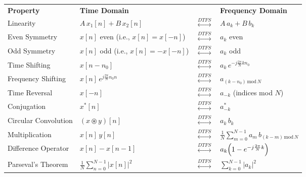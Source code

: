 \documentclass[8pt]{article}
\begin{document}
\begin{table}[ht]
        \label{tab:dtfourier_properties}
    \begin{tabular}{llll}
        \textbf{Property}    & \textbf{Time Domain}                    &                                     & \textbf{Frequency Domain}                                       \\
        Linearity            & \(A\,x_1[n] + B\,x_2[n]\)               & \(\overset{DTFS}{\leftrightarrow}\) & \(A\,a_k + B\,b_k\)                                             \\
        Even Symmetry        & \(x[n]\) even (i.e., \(x[n]=x[-n]\))    & \(\overset{DTFS}{\leftrightarrow}\) & \(a_k\) even                                                    \\
        Odd Symmetry         & \(x[n]\) odd (i.e., \(x[n]=-x[-n]\))    & \(\overset{DTFS}{\leftrightarrow}\) & \(a_k\) odd                                                     \\
        Time Shifting        & \(x[n-n_0]\)                            & \(\overset{DTFS}{\leftrightarrow}\) & \(a_k\,e^{-j\frac{2\pi}{N} k n_0}\)                             \\
        Frequency Shifting   & \(x[n]\,e^{j\frac{2\pi}{N} n_0 n}\)     & \(\overset{DTFS}{\leftrightarrow}\) & \(a_{(k-n_0)\,\mathrm{mod}\,N}\)                                \\
        Time Reversal        & \(x[-n]\)                               & \(\overset{DTFS}{\leftrightarrow}\) & \(a_{-k}\) (indices mod \(N\))                                  \\
        Conjugation          & \(x^*[n]\)                              & \(\overset{DTFS}{\leftrightarrow}\) & \(a^*_{-k}\)                                                    \\
        Circular Convolution & \((x\circledast y)[n]\)                 & \(\overset{DTFS}{\leftrightarrow}\) & \(a_k\,b_k\)                                                    \\
        Multiplication       & \(x[n]\,y[n]\)                          & \(\overset{DTFS}{\leftrightarrow}\) & \(\frac{1}{N}\sum_{m=0}^{N-1} a_m\,b_{(k-m)\,\mathrm{mod}\,N}\) \\
        Difference Operator  & \(x[n]-x[n-1]\)                         & \(\overset{DTFS}{\leftrightarrow}\) & \(a_k\Bigl(1-e^{-j\frac{2\pi}{N} k}\Bigr)\)                     \\
        Parseval's Theorem   & \(\frac{1}{N}\sum_{n=0}^{N-1}|x[n]|^2\) & \(\overset{DTFS}{\leftrightarrow}\) & \(\sum_{k=0}^{N-1}|a_k|^2\)                                     \\
    \end{tabular}
\end{table}
\end{document}
